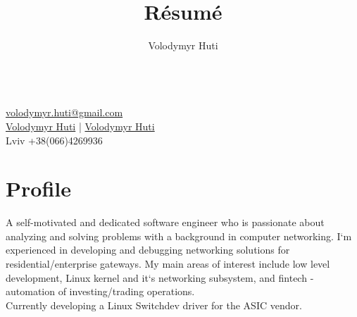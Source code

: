 \documentclass{article}
\author{Volodymyr Huti}
\title{R\'esum\'e}
\date{}
\makeatletter
\renewcommand{\maketitle}{
    \begin{center}
    {\huge\bfseries\theauthor}\\
    \vspace{.25em}
    \href{volodymyr.huti@gmail.com}{\faMailForward{} volodymyr.huti@gmail.com}\\
    \href{https://github.com/volodymyrhuti }{\faGithub{} Volodymyr Huti} |
    \href{https://www.linkedin.com/in/volodymyr-huti-b03a41156/}{\faLinkedinSquare{} Volodymyr Huti}\\
    Lviv +38(066)4269936 \\
    \end{center}
}
\makeatother
\begin{document}
\maketitle

\section{Profile}
A self-motivated and dedicated software engineer who is passionate about analyzing and solving problems
with a background in computer networking. I`m experienced in developing and debugging networking solutions
for residential/enterprise gateways. My main areas of interest include low level development, Linux kernel and
it`s networking subsystem, and fintech - automation of investing/trading operations.\\
Currently developing a Linux Switchdev driver for the ASIC vendor.
\end{document}
